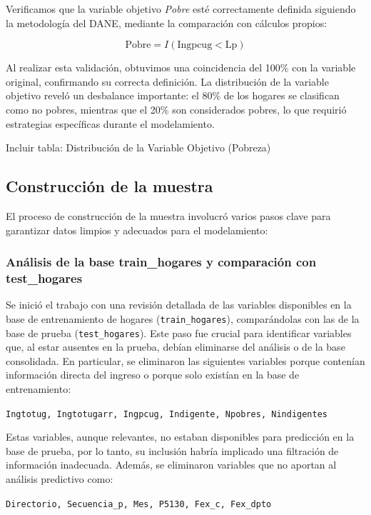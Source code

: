 \documentclass[12pt,a4paper,onecolumn]{article}
\begin{document}
Verificamos que la variable objetivo \textit{Pobre} esté correctamente definida siguiendo la metodología del DANE, mediante la comparación con cálculos propios:

\begin{equation}
\text{Pobre} = I(\text{Ingpcug} < \text{Lp})
\end{equation}

Al realizar esta validación, obtuvimos una coincidencia del 100\% con la variable original, confirmando su correcta definición. La distribución de la variable objetivo reveló un desbalance importante: el 80\% de los hogares se clasifican como no pobres, mientras que el 20\% son considerados pobres, lo que requirió estrategias específicas durante el modelamiento.

{\color{blue} Incluir tabla: Distribución de la Variable Objetivo (Pobreza)}

\subsection{Construcción de la muestra}

El proceso de construcción de la muestra involucró varios pasos clave para garantizar datos limpios y adecuados para el modelamiento:

\subsubsection{Análisis de la base train\_hogares y comparación con test\_hogares}

Se inició el trabajo con una revisión detallada de las variables disponibles en la base de entrenamiento de hogares (\texttt{train\_hogares}), comparándolas con las de la base de prueba (\texttt{test\_hogares}). Este paso fue crucial para identificar variables que, al estar ausentes en la prueba, debían eliminarse del análisis o de la base consolidada. En particular, se eliminaron las siguientes variables porque contenían información directa del ingreso o porque solo existían en la base de entrenamiento:

\texttt{Ingtotug, Ingtotugarr, Ingpcug, Indigente, Npobres, Nindigentes}

Estas variables, aunque relevantes, no estaban disponibles para predicción en la base de prueba, por lo tanto, su inclusión habría implicado una filtración de información inadecuada. Además, se eliminaron variables que no aportan al análisis predictivo como:

\texttt{Directorio, Secuencia\_p, Mes, P5130, Fex\_c, Fex\_dpto}
\end{document}
